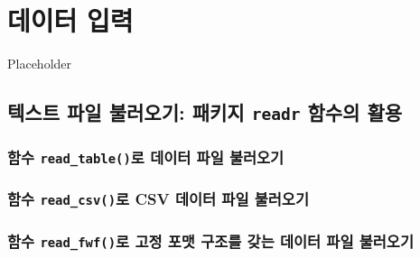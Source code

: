 \documentclass[
]{book}
\begin{document}
\hypertarget{uxb370uxc774uxd130-uxc785uxb825}{%
\chapter{데이터 입력}\label{uxb370uxc774uxd130-uxc785uxb825}}

Placeholder

\hypertarget{uxd14duxc2a4uxd2b8-uxd30cuxc77c-uxbd88uxb7ecuxc624uxae30-uxd328uxd0a4uxc9c0-readr-uxd568uxc218uxc758-uxd65cuxc6a9}{%
\section{\texorpdfstring{텍스트 파일 불러오기: 패키지 \texttt{readr} 함수의 활용}{텍스트 파일 불러오기: 패키지 readr 함수의 활용}}\label{uxd14duxc2a4uxd2b8-uxd30cuxc77c-uxbd88uxb7ecuxc624uxae30-uxd328uxd0a4uxc9c0-readr-uxd568uxc218uxc758-uxd65cuxc6a9}}

\hypertarget{uxd568uxc218-read_tableuxb85c-uxb370uxc774uxd130-uxd30cuxc77c-uxbd88uxb7ecuxc624uxae30}{%
\subsection{\texorpdfstring{함수 \texttt{read\_table()}로 데이터 파일 불러오기}{함수 read\_table()로 데이터 파일 불러오기}}\label{uxd568uxc218-read_tableuxb85c-uxb370uxc774uxd130-uxd30cuxc77c-uxbd88uxb7ecuxc624uxae30}}

\hypertarget{uxd568uxc218-read_csvuxb85c-csv-uxb370uxc774uxd130-uxd30cuxc77c-uxbd88uxb7ecuxc624uxae30}{%
\subsection{\texorpdfstring{함수 \texttt{read\_csv()}로 CSV 데이터 파일 불러오기}{함수 read\_csv()로 CSV 데이터 파일 불러오기}}\label{uxd568uxc218-read_csvuxb85c-csv-uxb370uxc774uxd130-uxd30cuxc77c-uxbd88uxb7ecuxc624uxae30}}

\hypertarget{uxd568uxc218-read_fwfuxb85c-uxace0uxc815-uxd3ecuxb9f7-uxad6cuxc870uxb97c-uxac16uxb294-uxb370uxc774uxd130-uxd30cuxc77c-uxbd88uxb7ecuxc624uxae30}{%
\subsection{\texorpdfstring{함수 \texttt{read\_fwf()}로 고정 포맷 구조를 갖는 데이터 파일 불러오기}{함수 read\_fwf()로 고정 포맷 구조를 갖는 데이터 파일 불러오기}}\label{uxd568uxc218-read_fwfuxb85c-uxace0uxc815-uxd3ecuxb9f7-uxad6cuxc870uxb97c-uxac16uxb294-uxb370uxc774uxd130-uxd30cuxc77c-uxbd88uxb7ecuxc624uxae30}}
\end{document}
